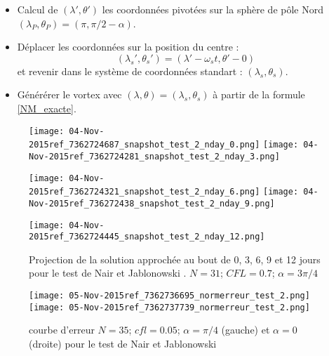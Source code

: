 \begin{itemize}
\item Calcul de $( \lambda' , \theta' )$ les coordonnées pivotées sur la sphère de p\^ole Nord $(\lambda_P, \theta_P ) = ( \pi, \pi/2 - \alpha )$.

\item Déplacer les coordonnées sur la position du centre :
  \begin{equation}
    ( \lambda _s ', \theta_s ' ) = ( \lambda' - \omega_s t, \theta' - 0)
  \end{equation}
  et revenir dans le système de coordonnées standart : $( \lambda_s , \theta_s )$.

\item Générérer le vortex avec $( \lambda, \theta ) = (\lambda_s ,  \theta_s )$ à partir de la formule \eqref{NM_exacte}.
  
  



\end{itemize}



















\begin{figure}[H]
\texttt{[image: 04-Nov-2015ref\_7362724687\_snapshot\_test\_2\_nday\_0.png]}
\texttt{[image: 04-Nov-2015ref\_7362724281\_snapshot\_test\_2\_nday\_3.png]}

\texttt{[image: 04-Nov-2015ref\_7362724321\_snapshot\_test\_2\_nday\_6.png]}
\texttt{[image: 04-Nov-2015ref\_736272438\_snapshot\_test\_2\_nday\_9.png]}

\texttt{[image: 04-Nov-2015ref\_7362724445\_snapshot\_test\_2\_nday\_12.png]}
\caption{Projection de la solution approchée au bout de 0, 3, 6, 9 et 12 jours pour le test de Nair et Jablonowski \cite{Nair2008}. $N=31$; $CFL = 0.7$; $\alpha = 3 \pi / 4$}
\label{SNAPSHOT}
\end{figure}



\begin{figure}[H]
\texttt{[image: 05-Nov-2015ref\_7362736695\_normerreur\_test\_2.png]}
\texttt{[image: 05-Nov-2015ref\_7362737739\_normerreur\_test\_2.png]}
\label{erreur_cfl=0.05}
\caption{courbe d'erreur $N=35$; $cfl=0.05$; $\alpha = \pi / 4$ (gauche) et $\alpha = 0$ (droite) pour le test de Nair et Jablonowski \cite{Nair2008}}
\end{figure}



